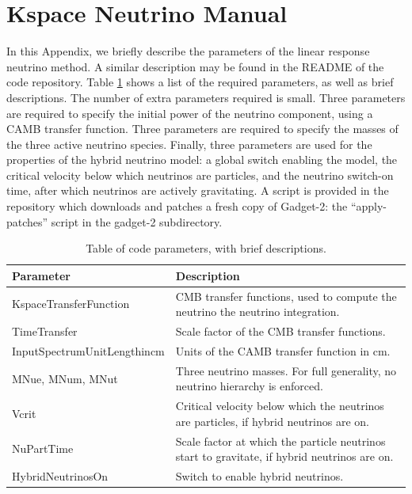 \documentclass[useAMS, usenatbib]{mnras}
\begin{document}
\appendix

\section{Kspace Neutrino Manual}
\label{sec:manual}

In this Appendix, we briefly describe the parameters of the linear response neutrino method. A similar description may be found in the README of the code repository. Table \ref{tab:parameters} shows a list of the required parameters, as well as brief descriptions. The number of extra parameters required is small. Three parameters are required to specify the initial power of the neutrino component, using a CAMB transfer function. Three parameters are required to specify the masses of the three active neutrino species. Finally, three parameters are used for the properties of the hybrid neutrino model: a global switch enabling the model, the critical velocity below which neutrinos are particles, and the neutrino switch-on time, after which neutrinos are actively gravitating. A script is provided in the repository which downloads and patches a fresh copy of Gadget-2: the ``apply-patches'' script in the gadget-2 subdirectory.

\begin{table}
\begin{center}
\begin{tabular}{|l|l|}
\hline
    Parameter & Description \\
\hline
KspaceTransferFunction   & CMB transfer functions, used to compute the neutrino the neutrino integration. \\
TimeTransfer             & Scale factor of the CMB transfer functions. \\
InputSpectrumUnitLengthincm   & Units of the CAMB transfer function in cm. \\
MNue, MNum, MNut &  Three neutrino masses. For full generality, no neutrino  hierarchy is enforced. \\
Vcrit            & Critical velocity below which the neutrinos are particles, if hybrid neutrinos are on. \\
NuPartTime       & Scale factor at which the particle neutrinos start to gravitate, if hybrid neutrinos are on. \\
HybridNeutrinosOn       & Switch to enable hybrid neutrinos. \\
\hline
\end{tabular}
\end{center}
\caption{Table of code parameters, with brief descriptions.}
\label{tab:parameters}
\end{table}
\end{document}
